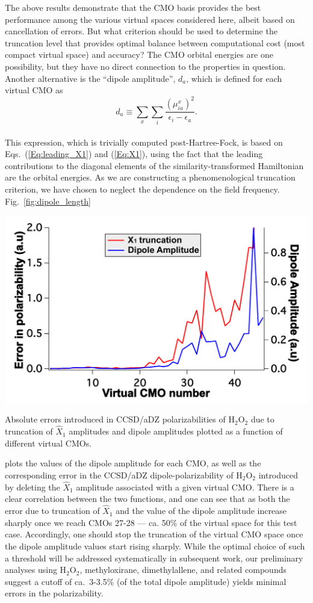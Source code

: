 The above results demonstrate that the CMO basis provides the best performance
among the various virtual spaces considered here, albeit based on cancellation
of errors. But what criterion should be used to determine the truncation level
that provides optimal balance between computational cost (most compact virtual
space) and accuracy?  The CMO orbital energies are one possibility, but they
have no direct connection to the properties in question.  Another alternative
is the ``dipole amplitude'', $d_a$, which is defined for each virtual CMO as
\\
\begin{equation}
d_a \equiv \sum\limits_x\sum\limits_i\frac{({\mu^x_{ia}})^2}{\epsilon_i - \epsilon_a}.
\label{Eq:dipole}
\end{equation}
\\
This expression, which is trivially computed post-Hartree-Fock, is based on
Eqs.~(\ref{Eq:leading_X1}) and (\ref{Eq:X1}), using the fact that the leading
contributions to the diagonal elements of the similarity-transformed
Hamiltonian are the orbital energies.    As we are constructing a
phenomenological truncation criterion, we have chosen to neglect the
dependence on the field frequency.
Fig.~\ref{fig:dipole_length} 
\begin{MyFigure}[h!]
\centering
\includegraphics[width=0.6\linewidth,natwidth=610,natheight=642]{figures_fvno/diplength.pdf}
\caption{{\footnotesize Absolute errors introduced in CCSD/aDZ
  polarizabilities of H$_2$O$_2$ due to truncation of $\hat{X}_1$ amplitudes and
  dipole amplitudes plotted as a function of different virtual CMOs.}}
\label{fig:dipole_length}
\end{MyFigure}
plots the values of the dipole amplitude for
each CMO, as well as the corresponding error in the CCSD/aDZ
dipole-polarizability of H$_2$O$_2$ introduced by deleting the $\hat{X}_1$
amplitude associated with a given virtual CMO. There is a clear correlation
between the two functions, and one can see that as both the error due to
truncation of $\hat{X}_1$ and the value of the dipole amplitude increase sharply
once we reach CMOs 27-28 --- ca. 50\% of the virtual space for this test case.
Accordingly, one should stop the truncation of the virtual CMO space once the
dipole amplitude values start rising sharply.  While the optimal choice of
such a threshold will be addressed systematically in subsequent work, our
preliminary analyses using H$_2$O$_2$, methyloxirane, dimethylallene, and
related compounds suggest a cutoff of ca.\ 3-3.5\% (of the total dipole amplitude) 
yields minimal errors in the polarizability.

